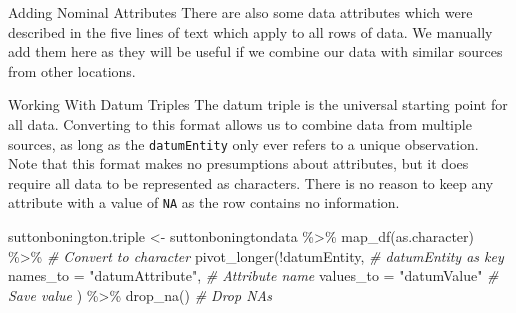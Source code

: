 \documentclass[
  ignorenonframetext,
]{beamer}
\newenvironment{Shaded}{\begin{snugshade}}{\end{snugshade}}
\newcommand{\AttributeTok}[1]{\textcolor[rgb]{0.77,0.63,0.00}{#1}}
\newcommand{\CommentTok}[1]{\textcolor[rgb]{0.56,0.35,0.01}{\textit{#1}}}
\newcommand{\DecValTok}[1]{\textcolor[rgb]{0.00,0.00,0.81}{#1}}
\newcommand{\FloatTok}[1]{\textcolor[rgb]{0.00,0.00,0.81}{#1}}
\newcommand{\FunctionTok}[1]{\textcolor[rgb]{0.00,0.00,0.00}{#1}}
\newcommand{\NormalTok}[1]{#1}
\newcommand{\OtherTok}[1]{\textcolor[rgb]{0.56,0.35,0.01}{#1}}
\newcommand{\SpecialCharTok}[1]{\textcolor[rgb]{0.00,0.00,0.00}{#1}}
\newcommand{\StringTok}[1]{\textcolor[rgb]{0.31,0.60,0.02}{#1}}
\begin{document}
\begin{frame}[fragile]{Adding Nominal Attributes}
\protect\hypertarget{adding-nominal-attributes}{}
There are also some data attributes which were described in the five
lines of text which apply to all rows of data. We manually add them here
as they will be useful if we combine our data with similar sources from
other locations.

\begin{Shaded}
\end{Shaded}
\end{frame}

\begin{frame}[fragile]{Working With Datum Triples}
\protect\hypertarget{working-with-datum-triples}{}
The datum triple is the universal starting point for all data.
Converting to this format allows us to combine data from multiple
sources, as long as the \texttt{datumEntity} only ever refers to a
unique observation. Note that this format makes no presumptions about
attributes, but it does require all data to be represented as
characters. There is no reason to keep any attribute with a value of
\texttt{NA} as the row contains no information.

\begin{Shaded}
\begin{Highlighting}[]
\NormalTok{suttonbonington.triple }\OtherTok{\textless{}{-}}\NormalTok{ suttonboningtondata }\SpecialCharTok{\%\textgreater{}\%} 
  \FunctionTok{map\_df}\NormalTok{(as.character) }\SpecialCharTok{\%\textgreater{}\%} \CommentTok{\# Convert to character}
  \FunctionTok{pivot\_longer}\NormalTok{(}\SpecialCharTok{!}\NormalTok{datumEntity, }\CommentTok{\# datumEntity as  key}
  \AttributeTok{names\_to =} \StringTok{"datumAttribute"}\NormalTok{, }\CommentTok{\# Attribute name}
  \AttributeTok{values\_to =} \StringTok{"datumValue"} \CommentTok{\# Save  value}
\NormalTok{      ) }\SpecialCharTok{\%\textgreater{}\%} \FunctionTok{drop\_na}\NormalTok{() }\CommentTok{\# Drop NAs}
\end{Highlighting}
\end{Shaded}
\end{frame}
\end{document}
